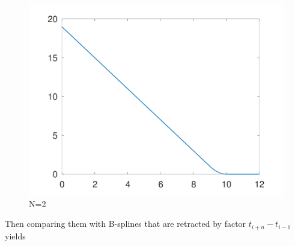 \documentclass{article}
\begin{document}
\begin{figure}[!htbp]
{\begin{minipage}[b]{.23\linewidth}
    \includegraphics[scale=0.1]{figures/Assignment_G_N2_1_2.png}
    \end{minipage}
    }
    \newline
    \caption{N=2}
    \end{figure}
\newpage

    Then comparing them with B-splines that are retracted by factor $t_{i+n}-t_{i-1}$ 
    yields
\end{document}
